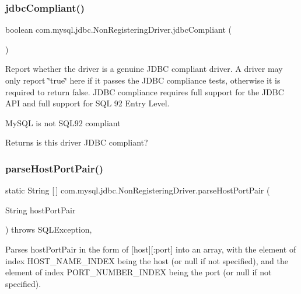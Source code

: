 \subsubsection{\texorpdfstring{jdbc\+Compliant()}{jdbcCompliant()}}
{\footnotesize\ttfamily boolean com.\+mysql.\+jdbc.\+Non\+Registering\+Driver.\+jdbc\+Compliant (\begin{DoxyParamCaption}{ }\end{DoxyParamCaption})}

Report whether the driver is a genuine J\+D\+BC compliant driver. A driver may only report \char`\"{}true\char`\"{} here if it passes the J\+D\+BC compliance tests, otherwise it is required to return false. J\+D\+BC compliance requires full support for the J\+D\+BC A\+PI and full support for S\+QL 92 Entry Level.

My\+S\+QL is not S\+Q\+L92 compliant 

\begin{DoxyReturn}{Returns}
is this driver J\+D\+BC compliant? 
\end{DoxyReturn}
\mbox{\label{classcom_1_1mysql_1_1jdbc_1_1_non_registering_driver_ac7360814a69eb287dc4c0b5f7ca06cbf}} 
\subsubsection{\texorpdfstring{parse\+Host\+Port\+Pair()}{parseHostPortPair()}}
{\footnotesize\ttfamily static String \mbox{[}$\,$\mbox{]} com.\+mysql.\+jdbc.\+Non\+Registering\+Driver.\+parse\+Host\+Port\+Pair (\begin{DoxyParamCaption}\item[{String}]{host\+Port\+Pair }\end{DoxyParamCaption}) throws S\+Q\+L\+Exception\hspace{0.3cm}{\ttfamily [static]}, {\ttfamily [protected]}}

Parses host\+Port\+Pair in the form of \mbox{[}host\mbox{]}\mbox{[}\+:port\mbox{]} into an array, with the element of index H\+O\+S\+T\+\_\+\+N\+A\+M\+E\+\_\+\+I\+N\+D\+EX being the host (or null if not specified), and the element of index P\+O\+R\+T\+\_\+\+N\+U\+M\+B\+E\+R\+\_\+\+I\+N\+D\+EX being the port (or null if not specified).



